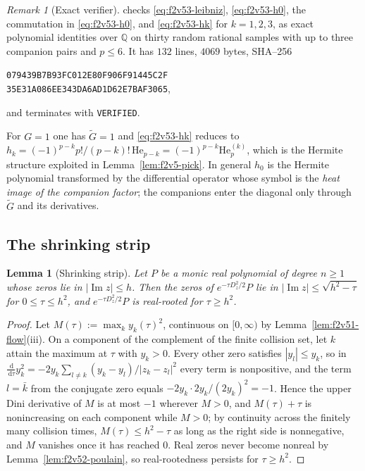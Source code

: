 \documentclass[11pt]{article}
\newtheorem{lemma}[theorem]{Lemma}
\theoremstyle{definition}
\theoremstyle{remark}
\newtheorem{remark}[theorem]{Remark}
\newcommand{\dd}{\,\mathrm d}
\begin{document}
\begin{remark}[Exact verifier]
\label{rem:f2v53-verifier}
 checks
\eqref{eq:f2v53-leibniz}, \eqref{eq:f2v53-h0}, the commutation in
\eqref{eq:f2v53-h0}, and \eqref{eq:f2v53-hk} for \(k=1,2,3\), as exact
polynomial identities over \(\mathbb Q\) on thirty random rational
samples with up to three companion pairs and \(p\le6\).  It has
\(132\) lines, \(4069\) bytes, SHA--256
\begin{center}
\texttt{079439B7B93FC012E80F906F91445C2F}\\
\texttt{35E31A086EE343DA6AD1D62E7BAF3065},
\end{center}
and terminates with \texttt{VERIFIED}.
\end{remark}

For \(G=1\) one has \(\widetilde G=1\) and \eqref{eq:f2v53-hk} reduces to
\(h_k=(-1)^{p-k}p!/(p-k)!\,\mathrm{He}_{p-k}=(-1)^{p-k}\mathrm{He}_p^{(k)}\),
which is the Hermite structure exploited in
Lemma~\ref{lem:f2v5-pick}.  In general \(h_0\) is the Hermite polynomial
transformed by the differential operator whose symbol is the
\emph{heat image of the companion factor}; the companions enter the
diagonal only through \(\widetilde G\) and its derivatives.

\subsection{The shrinking strip}

\begin{lemma}[Shrinking strip]
\label{lem:f2v53-strip}
Let \(P\) be a monic real polynomial of degree \(n\ge1\) whose zeros lie
in \(|\operatorname{Im}z|\le h\).  Then the zeros of
\(e^{-\tau D_z^2/2}P\) lie in \(|\operatorname{Im}z|\le\sqrt{h^2-\tau}\)
for \(0\le\tau\le h^2\), and \(e^{-\tau D_z^2/2}P\) is real-rooted for
\(\tau\ge h^2\).
\end{lemma}

\begin{proof}
Let \(M(\tau):=\max_k y_k(\tau)^2\), continuous on \([0,\infty)\) by
Lemma~\ref{lem:f2v51-flow}(iii).  On a component of the complement of
the finite collision set, let \(k\) attain the maximum at \(\tau\) with
\(y_k>0\).  Every other zero satisfies \(|y_l|\le y_k\), so in
\(\frac{\dd}{\dd\tau}y_k^2=-2y_k\sum_{l\ne k}(y_k-y_l)/|z_k-z_l|^2\)
every term is nonpositive, and the term \(l=\bar k\) from the conjugate
zero equals \(-2y_k\cdot2y_k/(2y_k)^2=-1\).  Hence the upper Dini
derivative of \(M\) is at most \(-1\) wherever \(M>0\), and \(M(\tau)+\tau\)
is nonincreasing on each component while \(M>0\); by continuity across
the finitely many collision times, \(M(\tau)\le h^2-\tau\) as long as the
right side is nonnegative, and \(M\) vanishes once it has reached \(0\).
Real zeros never become nonreal by Lemma~\ref{lem:f2v52-poulain}, so
real-rootedness persists for \(\tau\ge h^2\).
\end{proof}
\end{document}
